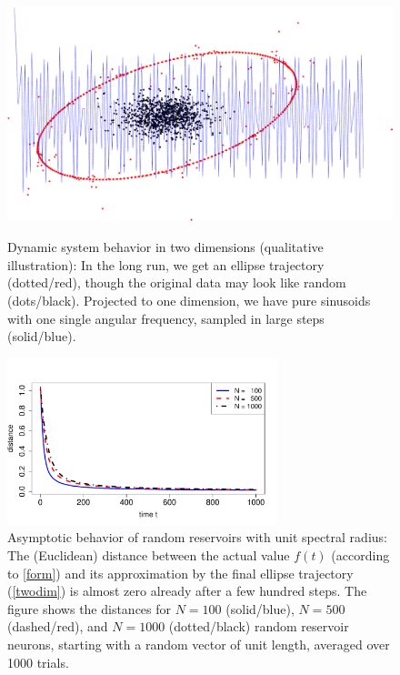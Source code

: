 \documentclass[twoside,11pt]{article}
\theoremstyle{definition}
\begin{document}
\begin{figure}
  \centering
  \includegraphics[height=7cm]{fig/title.pdf}
  \caption{Dynamic system behavior in two dimensions (qualitative illustration): In the long run, we get an
	ellipse trajectory (dotted/red), though the original data may look like random
	(dots/black). Projected to one dimension, we have pure sinusoids with one
	single angular frequency, sampled in large steps (solid/blue).}
  \label{ell}
\end{figure}

\begin{figure}
 \centering
 \includegraphics[width=0.7\textwidth]{fig/asymptot0} %
  \caption{Asymptotic behavior of random reservoirs with unit spectral radius:
	The (Euclidean) distance between the actual value $f(t)$
	(according to \cref{form}) and its approximation by the final ellipse
	trajectory (\cref{twodim}) is almost zero already after a few hundred
	steps. The figure shows the distances for $N=100$ (solid/blue), $N=500$
	(dashed/red), and $N=1000$ (dotted/black) random reservoir neurons,
	starting with a random vector of unit length, averaged over 1000 trials.}
  \label{asymptot}
\end{figure}
\end{document}
